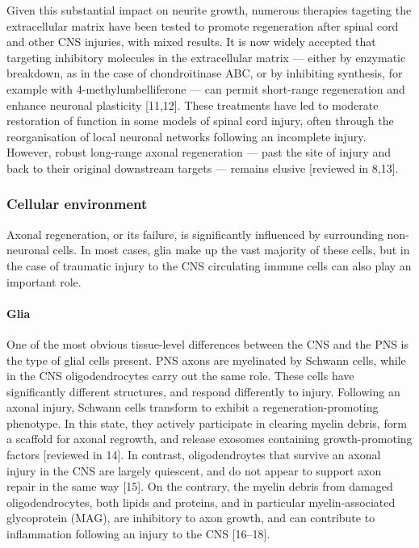 \documentclass[
  12pt,
  a4paper,
]{book}
\begin{document}
Given this substantial impact on neurite growth, numerous therapies tageting the extracellular matrix have been tested to promote regeneration after spinal cord and other CNS injuries, with mixed results. It is now widely accepted that targeting inhibitory molecules in the extracellular matrix --- either by enzymatic breakdown, as in the case of chondroitinase ABC, or by inhibiting synthesis, for example with 4-methylumbelliferone --- can permit short-range regeneration and enhance neuronal plasticity {[}11,12{]}. These treatments have led to moderate restoration of function in some models of spinal cord injury, often through the reorganisation of local neuronal networks following an incomplete injury. However, robust long-range axonal regeneration --- past the site of injury and back to their original downstream targets --- remains elusive {[}reviewed in 8,13{]}.

\subsubsection{Cellular environment}\label{cellular-environment}

Axonal regeneration, or its failure, is significantly influenced by surrounding non-neuronal cells. In most cases, glia make up the vast majority of these cells, but in the case of traumatic injury to the CNS circulating immune cells can also play an important role.

\paragraph{Glia}\label{glia}

One of the most obvious tissue-level differences between the CNS and the PNS is the type of glial cells present. PNS axons are myelinated by Schwann cells, while in the CNS oligodendrocytes carry out the same role. These cells have significantly different structures, and respond differently to injury. Following an axonal injury, Schwann cells transform to exhibit a regeneration-promoting phenotype. In this state, they actively participate in clearing myelin debris, form a scaffold for axonal regrowth, and release exosomes containing growth-promoting factors {[}reviewed in 14{]}. In contrast, oligodendroytes that survive an axonal injury in the CNS are largely quiescent, and do not appear to support axon repair in the same way {[}15{]}. On the contrary, the myelin debris from damaged oligodendrocytes, both lipids and proteins, and in particular myelin-associated glycoprotein (MAG), are inhibitory to axon growth, and can contribute to inflammation following an injury to the CNS {[}16--18{]}.
\end{document}
